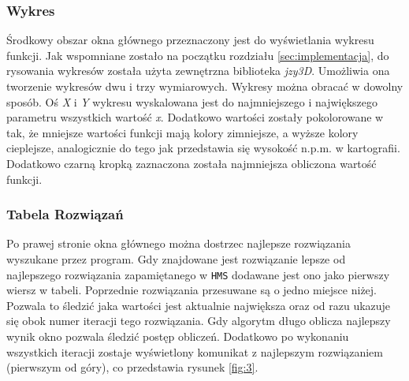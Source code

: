 \documentclass[10pt, a4paper]{article}
\begin{document}
\subsubsection{Wykres}
\label{subsubsec:wykres}
Środkowy obszar okna głównego przeznaczony jest do wyświetlania wykresu funkcji. Jak wspomniane zostało na początku rozdziału \ref{sec:implementacja}, do rysowania wykresów została użyta zewnętrzna biblioteka {\em jzy3D}. Umożliwia ona tworzenie wykresów dwu i trzy wymiarowych.  Wykresy można obracać w dowolny sposób. Oś {\em X} i {\em Y} wykresu wyskalowana jest do najmniejszego i największego parametru wszystkich wartość {\em x}. Dodatkowo wartości zostały pokolorowane w tak, że mniejsze wartości funkcji mają kolory zimniejsze, a wyższe kolory cieplejsze, analogicznie do tego jak przedstawia się wysokość n.p.m. w kartografii. Dodatkowo czarną kropką zaznaczona została najmniejsza obliczona wartość funkcji. 

\subsubsection{Tabela Rozwiązań}
\label{subsubsec:rozwiazania}
Po prawej stronie okna głównego można dostrzec najlepsze rozwiązania wyszukane przez program. Gdy znajdowane jest rozwiązanie lepsze od najlepszego rozwiązania zapamiętanego w {\tt HMS} dodawane jest ono jako pierwszy wiersz w tabeli. Poprzednie rozwiązania przesuwane są o jedno miejsce niżej. Pozwala to śledzić jaka wartości jest aktualnie największa oraz od razu ukazuje się obok numer iteracji tego rozwiązania. Gdy algorytm długo oblicza najlepszy wynik okno pozwala śledzić postęp obliczeń. Dodatkowo po wykonaniu wszystkich iteracji zostaje wyświetlony komunikat z najlepszym rozwiązaniem (pierwszym od góry), co przedstawia rysunek \ref{fig:3}.
\end{document}
